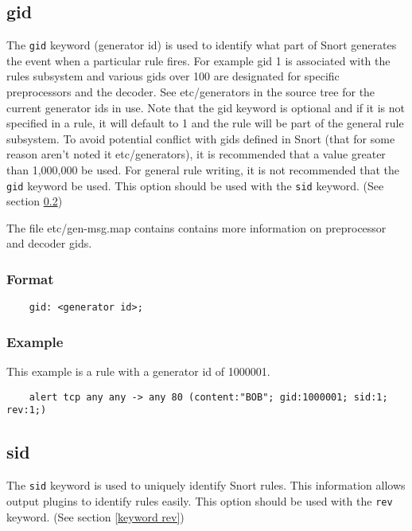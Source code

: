 \documentclass[english]{report}
\begin{document}
\subsection{gid}
\label{keyword gid}

The \texttt{gid} keyword (generator id) is used to identify what part of Snort
generates the event when a particular rule fires.  For example gid 1 is
associated with the rules subsystem and various gids over 100 are designated
for specific preprocessors and the decoder.  See etc/generators in the source
tree for the current generator ids in use.  Note that the gid keyword is
optional and if it is not specified in a rule, it will default to 1 and the
rule will be part of the general rule subsystem.  To avoid potential conflict
with gids defined in Snort (that for some reason aren't noted it
etc/generators), it is recommended that a value greater than 1,000,000 be used.
For general rule writing, it is not recommended that the \texttt{gid} keyword
be used.  This option should be used with the \texttt{sid} keyword.  (See
section \ref{keyword sid})

The file etc/gen-msg.map contains contains more information on preprocessor and
decoder gids.

\subsubsection{Format}

\begin{verbatim}
    gid: <generator id>;
\end{verbatim}

\subsubsection{Example}

This example is a rule with a generator id of 1000001. 

\begin{verbatim}
    alert tcp any any -> any 80 (content:"BOB"; gid:1000001; sid:1; rev:1;)
\end{verbatim}

\subsection{sid}
\label{keyword sid}

The \texttt{sid} keyword is used to uniquely identify Snort rules. This
information allows output plugins to identify rules easily.  This option should
be used with the \texttt{rev} keyword.  (See section \ref{keyword rev})
\end{document}
